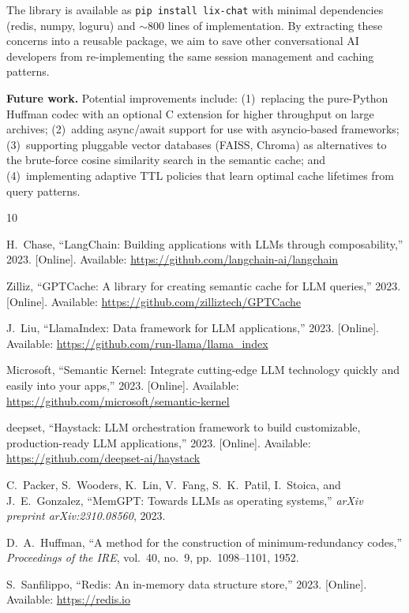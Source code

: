 \documentclass[conference]{IEEEtran}
\begin{document}
The library is available as \texttt{pip install lix-chat} with minimal dependencies (redis, numpy, loguru) and ${\sim}800$ lines of implementation. By extracting these concerns into a reusable package, we aim to save other conversational AI developers from re-implementing the same session management and caching patterns.

\textbf{Future work.} Potential improvements include: (1)~replacing the pure-Python Huffman codec with an optional C extension for higher throughput on large archives; (2)~adding async/await support for use with asyncio-based frameworks; (3)~supporting pluggable vector databases (FAISS, Chroma) as alternatives to the brute-force cosine similarity search in the semantic cache; and (4)~implementing adaptive TTL policies that learn optimal cache lifetimes from query patterns.

\begin{thebibliography}{10}

H.~Chase, ``LangChain: Building applications with LLMs through composability,'' 2023. [Online]. Available: \url{https://github.com/langchain-ai/langchain}

Zilliz, ``GPTCache: A library for creating semantic cache for LLM queries,'' 2023. [Online]. Available: \url{https://github.com/zilliztech/GPTCache}

J.~Liu, ``LlamaIndex: Data framework for LLM applications,'' 2023. [Online]. Available: \url{https://github.com/run-llama/llama_index}

Microsoft, ``Semantic Kernel: Integrate cutting-edge LLM technology quickly and easily into your apps,'' 2023. [Online]. Available: \url{https://github.com/microsoft/semantic-kernel}

deepset, ``Haystack: LLM orchestration framework to build customizable, production-ready LLM applications,'' 2023. [Online]. Available: \url{https://github.com/deepset-ai/haystack}

C.~Packer, S.~Wooders, K.~Lin, V.~Fang, S.~K.~Patil, I.~Stoica, and J.~E.~Gonzalez, ``MemGPT: Towards LLMs as operating systems,'' \textit{arXiv preprint arXiv:2310.08560}, 2023.

D.~A.~Huffman, ``A method for the construction of minimum-redundancy codes,'' \textit{Proceedings of the IRE}, vol.~40, no.~9, pp.~1098--1101, 1952.

S.~Sanfilippo, ``Redis: An in-memory data structure store,'' 2023. [Online]. Available: \url{https://redis.io}

\end{thebibliography}
\end{document}
